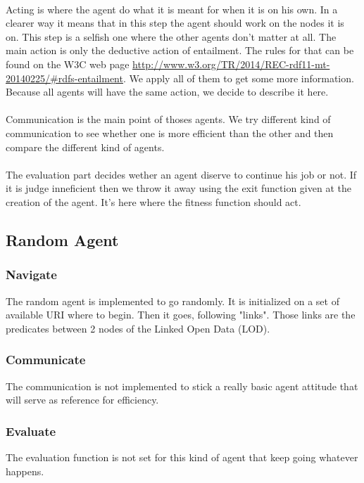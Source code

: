 \documentclass{article}
\begin{document}
	\paragraph{}
		Acting is where the agent do what it is meant for when it is on his own.
		In a clearer way it means that in this step the agent should work on the nodes it is on.
		This step is a selfish one where the other agents don't matter at all.
		The main action is only the deductive action of entailment.
		The rules for that can be found on the W3C web page \url{http://www.w3.org/TR/2014/REC-rdf11-mt-20140225/#rdfs-entailment}.
		We apply all of them to get some more information.
		Because all agents will have the same action, we decide to describe it here.
	\paragraph{}
		Communication is the main point of thoses agents.
		We try different kind of communication to see whether one is more efficient than the other
		and then compare the different kind of agents.
	\paragraph{}
		The evaluation part decides wether an agent diserve to continue his job or not.
		If it is judge inneficient then we throw it away using the exit function given at the creation of the agent.
		It's here where the fitness function should act.
	\subsection{Random Agent}
		\subsubsection{Navigate}
			The random agent is implemented to go randomly.
			It is initialized on a set of available URI where to begin.
			Then it goes, following "links".
			Those links are the predicates between 2 nodes of the Linked Open Data (LOD).
		\subsubsection{Communicate}
			The communication is not implemented to stick a really basic agent attitude that will serve as reference for efficiency.
		\subsubsection{Evaluate}
			The evaluation function is not set for this kind of agent that keep going whatever happens.
\end{document}
